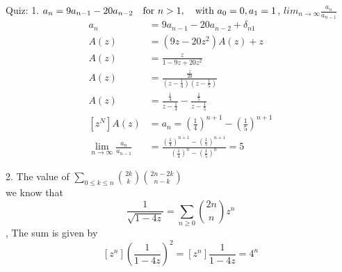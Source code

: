 \documentclass{article}
\begin{document}
Quiz:
1. $a_n=9a_{n-1}-20a_{n-2}\quad\hbox{for $n>1$},\quad\hbox{with $a_0 = 0,a_1=1$}$, $lim_{n \rightarrow \infty}\frac{a_n}{a_{n-1}}$\\
\begin{align*}
    a_n &= 9a_{n-1} - 20 a_{n-2} + \delta_{n1}\\
    A(z) &= (9z - 20z^2)A(z) + z\\
    A(z) &= \frac{z}{1 - 9z + 20z^2}\\
    A(z) &= \frac{\frac{z}{20}}{(z-\frac{1}{4}) (z - \frac{1}{5})} \\
    A(z) &= \frac{\frac{1}{4}}{z - \frac{1}{4}} - \frac{\frac{1}{5}}{z - \frac{1}{5}}\\
    [z^N]A(z) &= a_n = (\frac{1}{4})^{n+1} - (\frac{1}{5})^{n+1}\\
    \lim_{n\rightarrow\infty} \frac{a_n}{a_{n-1}} &= \frac{(\frac{1}{4})^{n+1} - (\frac{1}{5})^{n+1}}{(\frac{1}{4})^{n} - (\frac{1}{5})^{n}} = 5
\end{align*}

2. The value of $\sum_{0 \leq k \leq n} \binom{2k}{k}\binom{2n-2k}{n-k}$\\
we know that 
\[\frac{1}{\sqrt{1-4z}} = \sum_{n \geq 0} \binom{2n}{n}z^n\],
The sum is given by
\[[z^n](\frac{1}{1-4z})^2 = [z^n]\frac{1}{1-4z} = 4^n\]
\end{document}

